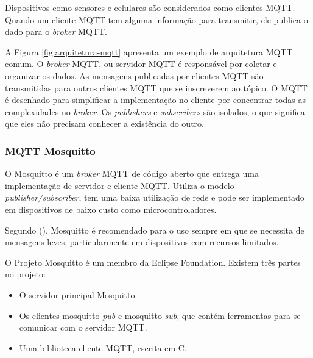 \newpage

Dispositivos como sensores e celulares são considerados como clientes MQTT. Quando um cliente MQTT tem alguma informação para transmitir, ele publica o dado para o \textit {broker} MQTT.

A Figura \ref{fig:arquitetura-mqtt} apresenta um exemplo de arquitetura MQTT comum. O \textit {broker} MQTT, ou servidor MQTT é responsável por coletar e organizar os dados. As mensagens publicadas por clientes MQTT são transmitidas para outros clientes MQTT que se inscreverem ao tópico. O MQTT é desenhado para simplificar a implementação no cliente por concentrar todas as complexidades no \textit {broker}. Os \textit {publishers} e \textit {subscribers} são isolados, o que significa que eles não precisam conhecer a existência do outro.

\subsubsection{MQTT Mosquitto}

O Mosquitto é um \textit{broker} MQTT de código aberto \cite{Kodali2017} que entrega uma implementação de servidor e cliente MQTT. Utiliza o modelo \textit{publisher/subscriber}, tem uma baixa utilização de rede e pode ser implementado em dispositivos de baixo custo como microcontroladores. \cite{Light}

Segundo \citeauthor{Light} (\citeyear{Light}), Mosquitto é recomendado para o uso sempre em que se necessita de mensagens leves, particularmente em dispositivos com recursos limitados.

O Projeto Mosquitto é um membro da Eclipse Foundation. Existem três partes no projeto:

\begin{itemize}
	\item O servidor principal Mosquitto.
	\item Os clientes mosquitto \textit{pub} e mosquitto \textit{sub}, que contém ferramentas para se comunicar com o servidor MQTT.
	\item Uma biblioteca cliente MQTT, escrita em C.
\end{itemize}

